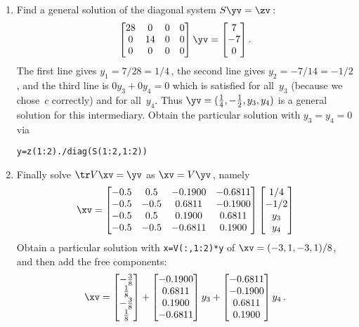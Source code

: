 \begin{example}
\begin{solution}
\begin{enumerate}
\item Find a general solution of the diagonal system \(S\yv=\zv\)\,:
\begin{equation*}
\begin{bmatrix}28&0&0&0
\\0&14&0&0
\\0&0&0&0 \end{bmatrix}\yv=\begin{bmatrix} 7\\-7\\0 \end{bmatrix}.
\end{equation*}
The first line gives \(y_1=7/28=1/4\)\,, the second line gives \(y_2=-7/14=-1/2\), and the third line is \(0y_3+0y_4=0\) which is satisfied for all~\(y_3\) (because we chose~\(c\) correctly) and for all~\(y_4\).
Thus \(\yv=(\frac14,-\frac12,y_3,y_4)\) is a general solution for this intermediary.
Obtain the particular solution with \(y_3=y_4=0\) via 
\begin{verbatim}
y=z(1:2)./diag(S(1:2,1:2))
\end{verbatim}

\item Finally solve \(\tr V\xv=\yv\) as \(\xv=V\yv\)\,, namely
\begin{equation*}
\xv=\begin{bmatrix} -0.5&0.5&-0.1900&-0.6811
\\-0.5&-0.5&0.6811&-0.1900
\\-0.5&0.5&0.1900&0.6811
\\-0.5&-0.5&-0.6811&0.1900 \end{bmatrix}
\begin{bmatrix} 1/4\\-1/2\\y_3\\y_4 \end{bmatrix}
\end{equation*}
Obtain a particular solution with \verb|x=V(:,1:2)*y| of \(\xv=(-3,1,-3,1)/8\), and then add the free components:
\begin{equation*}
\xv=\begin{bmatrix} -\frac38\\\frac18\\-\frac38\\\frac18 \end{bmatrix}
+\begin{bmatrix}-0.1900
\\0.6811
\\0.1900
\\-0.6811 \end{bmatrix}y_3
+\begin{bmatrix} -0.6811
\\-0.1900
\\0.6811
\\0.1900 \end{bmatrix}y_4\,.
\end{equation*}

\end{enumerate}
\end{solution}
\end{example}
